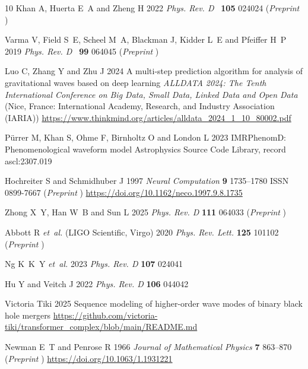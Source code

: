 \documentclass[12pt]{iopart}
\def\prd{{\it Phys. Rev.} D~}
\begin{document}
\begin{thebibliography}{10}
{Khan} A, {Huerta} E~A and {Zheng} H 2022 {\em \prd\/} {\bf 105} 024024
  (\textit{Preprint} )

{Varma} V, {Field} S~E, {Scheel} M~A, {Blackman} J, {Kidder} L~E and {Pfeiffer}
  H~P 2019 {\em \prd\/} {\bf 99} 064045 (\textit{Preprint} )

Luo C, Zhang Y and Zhu J 2024 A multi-step prediction algorithm for analysis of
  gravitational waves based on deep learning {\em ALLDATA 2024: The Tenth
  International Conference on Big Data, Small Data, Linked Data and Open
  Data\/} (Nice, France: International Academy, Research, and Industry
  Association (IARIA))
  \urlprefix\url{https://www.thinkmind.org/articles/alldata_2024_1_10_80002.pdf}

{P{\"u}rrer} M, {Khan} S, {Ohme} F, {Birnholtz} O and {London} L 2023
  {IMRPhenomD: Phenomenological waveform model} Astrophysics Source Code
  Library, record ascl:2307.019

Hochreiter S and Schmidhuber J 1997 {\em Neural Computation\/} {\bf 9}
  1735--1780 ISSN 0899-7667 (\textit{Preprint}
  )
  \urlprefix\url{https://doi.org/10.1162/neco.1997.9.8.1735}

Zhong X~Y, Han W~B and Sun L 2025 {\em Phys. Rev. D\/} {\bf 111} 064033
  (\textit{Preprint} )

Abbott R {\em et~al.\/} (LIGO Scientific, Virgo) 2020 {\em Phys. Rev. Lett.\/}
  {\bf 125} 101102 (\textit{Preprint} )

Ng K~K~Y {\em et~al.\/} 2023 {\em Phys. Rev. D\/} {\bf 107} 024041

Hu Y and Veitch J 2022 {\em Phys. Rev. D\/} {\bf 106} 044042

{Victoria Tiki} 2025 {Sequence modeling of higher-order wave modes of binary
  black hole mergers}
  \url{https://github.com/victoria-tiki/transformer_complex/blob/main/README.md}

Newman E~T and Penrose R 1966 {\em Journal of Mathematical Physics\/} {\bf 7}
  863--870 (\textit{Preprint} )
  \urlprefix\url{https://doi.org/10.1063/1.1931221}


\end{thebibliography}
\end{document}
